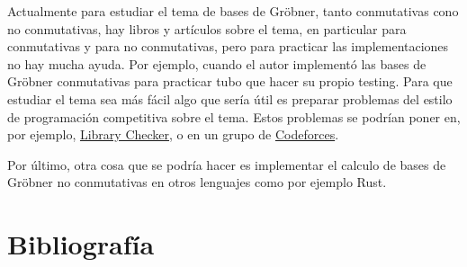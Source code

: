 \documentclass[12pt]{report}
\theoremstyle{customstyle}
\theoremstyle{factstyle}
\begin{document}
Actualmente para estudiar el tema de bases de Gröbner, tanto conmutativas cono no conmutativas, hay libros y artículos sobre el tema, en particular \cite{book:ideals-varieties-algorithms} para conmutativas y \cite{thesis:Hof20} para no conmutativas, pero para practicar las implementaciones no hay mucha ayuda. Por ejemplo, cuando el autor implementó las bases de Gröbner conmutativas para practicar tubo que hacer su propio testing. Para que estudiar el tema sea más fácil algo que sería útil es preparar problemas del estilo de programación competitiva sobre el tema. Estos problemas se podrían poner en, por ejemplo, \href{https://judge.yosupo.jp}{Library Checker}, o en un grupo de \href{https://codeforces.com}{Codeforces}.

Por último, otra cosa que se podría hacer es implementar el calculo de bases de Gröbner no conmutativas en otros lenguajes como por ejemplo Rust.


\chapter{Bibliografía}

\printbibliography[heading=none]
\end{document}
